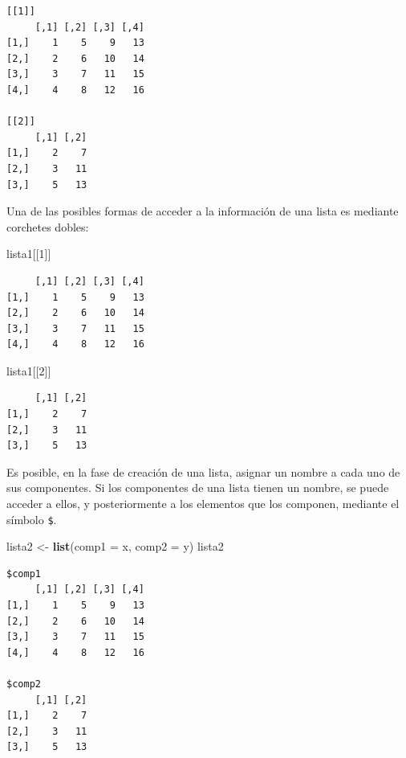 \documentclass[
]{article}
\newenvironment{Shaded}{\begin{snugshade}}{\end{snugshade}}
\newcommand{\AttributeTok}[1]{\textcolor[rgb]{0.13,0.29,0.53}{#1}}
\newcommand{\DecValTok}[1]{\textcolor[rgb]{0.00,0.00,0.81}{#1}}
\newcommand{\FunctionTok}[1]{\textcolor[rgb]{0.13,0.29,0.53}{\textbf{#1}}}
\newcommand{\NormalTok}[1]{#1}
\newcommand{\OtherTok}[1]{\textcolor[rgb]{0.56,0.35,0.01}{#1}}
\begin{document}
\begin{verbatim}
[[1]]
     [,1] [,2] [,3] [,4]
[1,]    1    5    9   13
[2,]    2    6   10   14
[3,]    3    7   11   15
[4,]    4    8   12   16

[[2]]
     [,1] [,2]
[1,]    2    7
[2,]    3   11
[3,]    5   13
\end{verbatim}

Una de las posibles formas de acceder a la información de una lista es mediante corchetes dobles:

\begin{Shaded}
\begin{Highlighting}[]
\NormalTok{lista1[[}\DecValTok{1}\NormalTok{]]}
\end{Highlighting}
\end{Shaded}

\begin{verbatim}
     [,1] [,2] [,3] [,4]
[1,]    1    5    9   13
[2,]    2    6   10   14
[3,]    3    7   11   15
[4,]    4    8   12   16
\end{verbatim}

\begin{Shaded}
\begin{Highlighting}[]
\NormalTok{lista1[[}\DecValTok{2}\NormalTok{]]}
\end{Highlighting}
\end{Shaded}

\begin{verbatim}
     [,1] [,2]
[1,]    2    7
[2,]    3   11
[3,]    5   13
\end{verbatim}

Es posible, en la fase de creación de una lista, asignar un nombre a cada uno de sus componentes. Si los componentes de una lista tienen un nombre, se puede acceder a ellos, y posteriormente a los elementos que los componen, mediante el símbolo \texttt{\$}.

\begin{Shaded}
\begin{Highlighting}[]
\NormalTok{lista2 }\OtherTok{\textless{}{-}} \FunctionTok{list}\NormalTok{(}\AttributeTok{comp1 =}\NormalTok{ x, }\AttributeTok{comp2 =}\NormalTok{ y)}
\NormalTok{lista2}
\end{Highlighting}
\end{Shaded}

\begin{verbatim}
$comp1
     [,1] [,2] [,3] [,4]
[1,]    1    5    9   13
[2,]    2    6   10   14
[3,]    3    7   11   15
[4,]    4    8   12   16

$comp2
     [,1] [,2]
[1,]    2    7
[2,]    3   11
[3,]    5   13
\end{verbatim}
\end{document}
